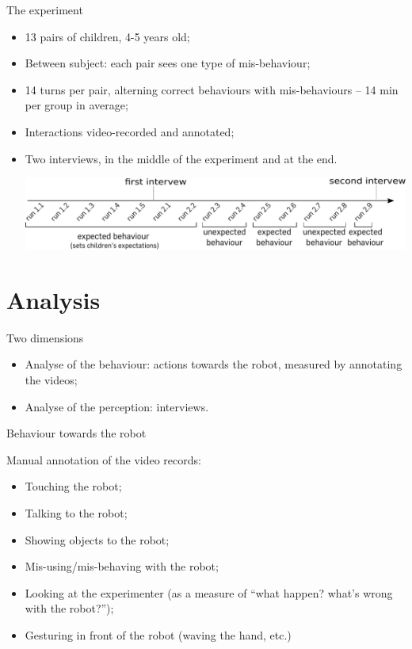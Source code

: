 \documentclass[compress]{beamer}
\renewcommand{\bf}{\Medium}
\begin{document}
\begin{frame}{The experiment}
    \begin{itemize}
        \item 13 pairs of children, 4-5 years old;
        \item Between subject: each pair sees one type of mis-behaviour;
        \item 14 turns per pair, alterning correct behaviours with
            mis-behaviours -- 14 min per group in average;
        \item Interactions video-recorded and annotated;
        \item Two interviews, in the middle of the experiment and at the
            end.
    \begin{center}
    	\includegraphics[width=\textwidth]{domino-time}
    \end{center}
    \end{itemize}
\end{frame}

\section{Analysis}

\begin{frame}{Two dimensions}
    \begin{itemize}
        \item Analyse of the {\bf behaviour}: actions towards the robot,
            measured by annotating the videos;
        \item Analyse of the {\bf perception}: interviews.
    \end{itemize}
\end{frame}


\begin{frame}{Behaviour towards the robot}

    Manual annotation of the video records:
    \begin{itemize}
        \item {\bf Touching} the robot;
        \item {\bf Talking} to the robot;
        \item {\bf Showing objects} to the robot;
        \item {\bf Mis-using/mis-behaving} with the robot;
        \item {\bf Looking at the experimenter} (as a measure of ``what happen? what's
            wrong with the robot?'');
        \item {\bf Gesturing} in front of the robot (waving the hand, etc.)
    \end{itemize}
\end{frame}
\end{document}
